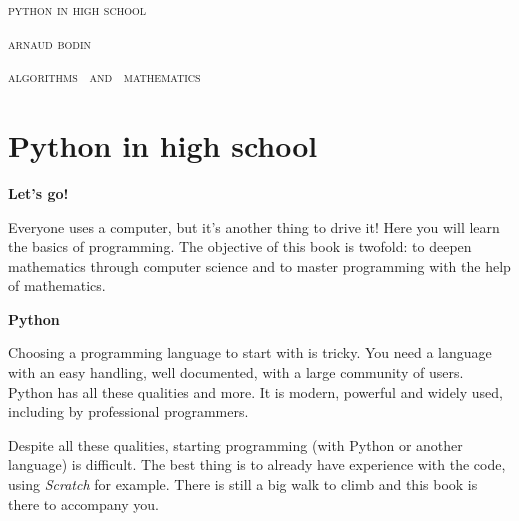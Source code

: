 
\pagestyle{empty}\thispagestyle{empty}
\vspace*{\fill}
\vspace*{5ex}
\begin{center}
\fontsize{40}{40}\selectfont
\textsc{python in high school}


\vspace*{2ex}

\Large
\textsc{arnaud bodin}

\end{center}
\vfill
\begin{center}
\Large
\textsc{algorithms \  and  \  mathematics}
\end{center}
\begin{center}
\end{center}

\clearpage

\thispagestyle{empty}

\vspace*{\fill}
\section*{Python in high school}

{\large\textbf{Let's go!}}

Everyone uses a computer, but it's another thing to drive it! Here you will learn the basics of programming. The objective of this book is twofold: to deepen mathematics through computer science and to master programming with the help of mathematics. 

\bigskip

{\large\textbf{Python}}

Choosing a programming language to start with is tricky. You need a language with an easy handling, well documented, with a large community of users. Python has all these qualities and more. It is modern, powerful and widely used, including by professional programmers. 

Despite all these qualities, starting programming (with Python or another language) is difficult. The best thing is to already have experience with the code, using \emph{Scratch} for example. There is still a big walk to climb and this book is there to accompany you.

